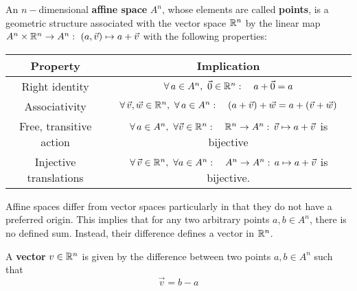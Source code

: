 \documentclass{article}
\begin{document}
		\begin{defn}
			An $n-$dimensional \textbf{affine space} $A^n$, whose elements are called \textbf{points}, is a geometric structure associated with the vector space $\mathbb{R}^n$ by the linear map $A^n \times \mathbb{R}^n \to A^n: \,\, \left(a,\vec{v}\right) \mapsto a + \vec{v}$ with the following properties:
			\begin{table}[h]
				\begin{tabular}{|c|c|}
					\hline
					\textbf{Property} & \textbf{Implication} \\ \hline
					Right identity & $\forall \, a \in A^n, \,\, \vec{0} \in \mathbb{R}^n: \quad a + \vec{0} = a$ \\ \hline
					Associativity & $\forall \, \vec{v}, \vec{w} \in \mathbb{R}^n, \,\, \forall \, a \in A^n: \quad \left(a+\vec{v} \right) + \vec{w} = a + \left(\vec{v} + \vec{w} \right)$ \\ \hline
					Free, transitive action &  $\forall \, a \in A^n, \,\, \forall \vec{v} \in \mathbb{R}^n: \quad \mathbb{R}^n \to A^n: \, \vec{v} \mapsto a + \vec{v} $ is bijective \\ \hline
					Injective translations & $\forall \, \vec{v} \in \mathbb{R}^n, \,\, \forall a \in A^n: \quad A^n \to A^n: \, a \mapsto a + \vec{v}$ is bijective. \\ \hline
				\end{tabular}
			\end{table}			
		\end{defn}
		Affine spaces differ from vector spaces particularly in that they do not have a preferred origin. This implies that for any two arbitrary points $a, b \in A^n$, there is no defined sum. Instead, their difference defines a vector in $\mathbb{R}^n$.
		\begin{defn}
			A \textbf{vector} $v \in \mathbb{R}^n$ is given by the difference between two points $a, b \in A^n$ such that
			\begin{equation}
				\label{eq:VectorFromAffine}
				\vec{v} = b - a
			\end{equation}
		\end{defn}
\end{document}

